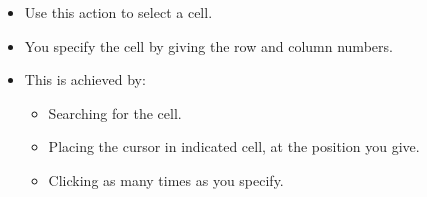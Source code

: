 \begin{itemize}
\item Use this action to select a cell.
\item You specify the cell by giving the row and column numbers.
\item This is achieved by:
\begin{itemize}
\item Searching for the cell.
\item Placing the cursor in indicated cell, at the position you give.
\item Clicking as many times as you specify.
\end{itemize}

\end{itemize}
